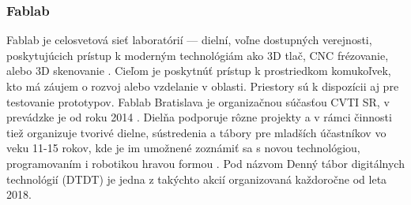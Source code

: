 \newpage
\subsubsection*{Fablab}
Fablab je celosvetová sieť laboratórií --- dielní, voľne dostupných verejnosti, poskytujúcich prístup k moderným technológiám ako 3D tlač, CNC frézovanie, alebo 3D skenovanie \cite{Fablab}. Cieľom je poskytnúť prístup k prostriedkom komukoľvek, kto má záujem o rozvoj alebo vzdelanie v oblasti. Priestory sú k dispozícii aj pre testovanie prototypov. Fablab Bratislava je organizačnou súčasťou CVTI SR, v prevádzke je od roku 2014 \cite{FablabVedeckyParkUK}. Dielňa podporuje rôzne projekty a v rámci činnosti tiež organizuje tvorivé dielne, sústredenia a tábory pre mladších účastníkov vo veku 11-15 rokov, kde je im umožnené zoznámiť sa s novou technológiou, programovaním i robotikou hravou formou \cite{FablabDTDT}. Pod názvom Denný tábor digitálnych technológií (DTDT) je jedna z takýchto akcií organizovaná každoročne od leta 2018.

